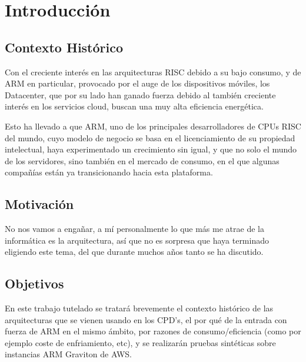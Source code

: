 \documentclass[a4paper,openright,12pt]{article}
\begin{document}
\justifying{}

\section{Introducción}\label{section:introduccion}
\subsection{Contexto Histórico}
Con el creciente interés en las arquitecturas RISC debido a su bajo consumo, y de ARM en particular, provocado por el auge de los dispositivos móviles,
los Datacenter, que por su lado han ganado fuerza debido al también creciente interés en los servicios cloud, buscan una muy alta eficiencia
energética.

Esto ha llevado a que ARM, uno de los principales desarrolladores de CPUs RISC del mundo, cuyo modelo de negocio se basa en el licenciamiento de su propiedad intelectual,
haya experimentado un crecimiento sin igual, y que no solo el mundo de los servidores, sino también en el mercado de consumo, en el que algunas compañías están ya transicionando
hacia esta plataforma. \parencite{apple_m1_overview}

\subsection{Motivación}\label{subsection:motivacion}
No nos vamos a engañar, a mí personalmente lo que más me atrae de la informática es la arquitectura, así que no es sorpresa que haya terminado eligiendo este tema, del que durante muchos
años tanto se ha discutido. \parencite{risc_vs_cisc_6522302}

\subsection{Objetivos}\label{subsection:objetivos}
En este trabajo tutelado se tratará brevemente el contexto histórico de las arquitecturas que se vienen usando en los CPD's, el por qué de la entrada con fuerza de ARM en el
mismo ámbito, por razones de consumo/eficiencia (como por ejemplo coste de enfriamiento, etc), y se realizarán pruebas sintéticas sobre instancias ARM Graviton de AWS.\parencite{arm_aws_graviton_overview}
\end{document}
